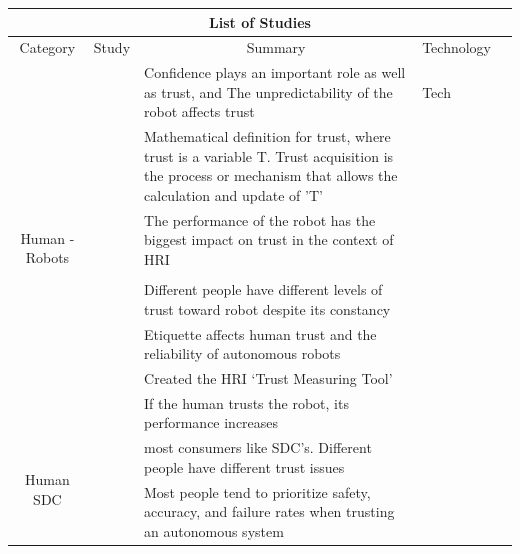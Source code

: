 \documentclass[runningheads,a4paper]{llncs}
\begin{document}
\begin{longtable}{|c|c|p{5cm}|p{3cm}|p{1cm}|}
\hline
\multicolumn{5}{|c|}{List of Studies}                                                                                               \\ \hline
Category                        & Study & \multicolumn{1}{c|}{Summary}    & \multicolumn{1}{c|}{Technology} & \multicolumn{1}{c|}{} \\ \hline
\multirow{8}{*}{Human - Robots} 
	& \cite{stormont2008analyzing}    
	&  Confidence plays an important role as well as trust, and The unpredictability of the robot affects trust  
	& Tech                            
	&                       
	\\ \cline{2-5} 
	& \cite{esfandiari2001agents}     
	& Mathematical definition for trust, where trust is a variable T. Trust acquisition is the process or mechanism that allows the calculation and update of 'T'
	&                                 
	&                       
	\\ \cline{2-5} 
	& \cite{hancock2011meta}
	& The performance of the robot has the biggest impact on trust in the context of HRI
	&                                 
	&
	\\ \cline{2-5}
	&  \cite{penders2013enhancing}
	& 
	&                                 
	&
	\\ \cline{2-5} 
	& \cite{merritt2008not}
	& Different people have different levels of trust toward robot despite its constancy
	&                                 
	&
	\\ \cline{2-5} 
	& \cite{parasuraman2004trust}
	& Etiquette affects human trust and the reliability of autonomous robots
	&                                 
	&
	\\ \cline{2-5} 
	& \cite{yagoda2012you}
	& Created the HRI `Trust Measuring Tool'
	&                                 
	&
	\\ \cline{2-5} 
	& \cite{wang2014human}
	& If the human trusts the robot, its performance increases
	&                                 
	&           
	\\ \hline
\multirow{5}{*}{Human SDC}      
	& \cite{howard2014public}  
	& most consumers like SDC's. Different people have different trust issues                     
	&                                 
	&                       
	\\ \cline{2-5} 
	& \cite{carlson2014identifying}
	& Most people tend to prioritize safety, accuracy, and failure rates when trusting an autonomous system                       

\end{longtable}
\end{document}
